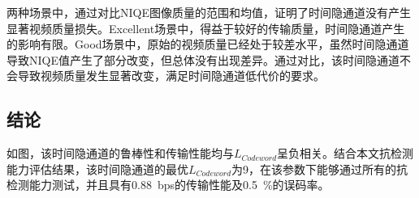 两种场景中，通过对比NIQE图像质量的范围和均值，证明了时间隐通道没有产生显著视频质量损失。Excellent场景中，得益于较好的传输质量，时间隐通道产生的影响有限。Good场景中，原始的视频质量已经处于较差水平，虽然时间隐通道导致NIQE值产生了部分改变，但总体没有出现差异。通过对比，该时间隐通道不会导致视频质量发生显著改变，满足时间隐通道低代价的要求。

\subsection{结论}
\label{chap:zigzag:results:conclusion}


如图，该时间隐通道的鲁棒性和传输性能均与$L_{Codeword}$呈负相关。结合本文抗检测能力评估结果，该时间隐通道的最优$L_{Codeword}$为9，在该参数下能够通过所有的抗检测能力测试，并且具有{0.88\ bps}的传输性能及{0.5\ \%}的误码率。

